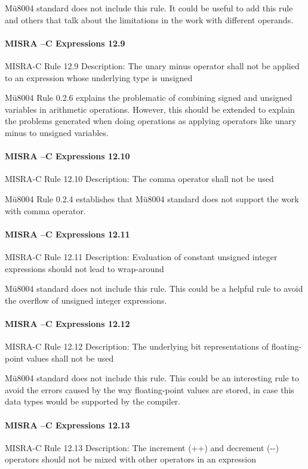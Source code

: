 Mü8004 standard does not include this rule. It could be useful to add this rule and others that talk about the limitations in the work with different operands.

\paragraph{MISRA –C Expressions 12.9}
MISRA-C Rule 12.9 Description: The unary minus operator shall not be applied to an expression whose underlying type is unsigned

Mü8004 Rule 0.2.6 explains the problematic of combining signed and unsigned variables in arithmetic operations. However, this should be extended to explain the problems generated when doing operations as applying operators like unary minus to unsigned variables.

\paragraph{MISRA –C Expressions 12.10}
MISRA-C Rule 12.10 Description: The comma operator shall not be used

Mü8004 Rule 0.2.4 establishes that Mü8004 standard does not support the work with comma operator. 

\paragraph{MISRA –C Expressions 12.11}
MISRA-C Rule 12.11 Description: Evaluation of constant unsigned integer expressions should not lead to wrap-around

Mü8004 standard does not include this rule. This could be a helpful rule to avoid the overflow of unsigned integer expressions.

\paragraph{MISRA –C Expressions 12.12}
MISRA-C Rule 12.12 Description: The underlying bit representations of floating-point values shall not be used

Mü8004 standard does not include this rule. This could be an interesting rule to avoid the errors caused by the way floating-point values are stored, in case this data types would be supported by the compiler.

\paragraph{MISRA –C Expressions 12.13}
MISRA-C Rule 12.13 Description: The increment (++) and decrement (-{}-) operators should not be mixed with other operators in an expression

